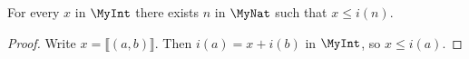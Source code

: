 \begin{lemma}
    \label{MyInt.archimedean}
    \leanok
    For every $x$ in $\MyInt$ there exists $n$ in $\MyNat$ such that $x \leq i(n)$.
\end{lemma}
\begin{proof}
    \leanok
    Write $x = ⟦(a,b)⟧$. Then $i(a) = x + i(b)$ in $\MyInt$, so $x \leq i(a)$.
\end{proof}

